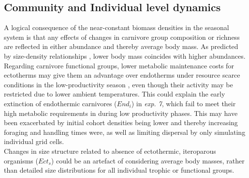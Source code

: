 \subsection{Community and Individual level dynamics}
A logical consequence of the near-constant biomass densities in the seasonal system is that any effects of changes in carnivore group composition or richness are reflected in either abundance and thereby average body mass. As predicted by size-density relationships \citep[cf.][]{White2007}, lower body mass coincides with higher abundances. \\
Regarding carnivore functional groups, lower metabolic maintenance costs for ectotherms may give them an advantage over endotherms under resource scarce conditions in the low-productivity season \citep{Shine2005}, even though their activity may be restricted due to lower ambient temperatures. 
This could explain the early extinction of endothermic carnivores ($End_i$) in \textit{exp. 7}, which fail to meet their high metabolic requirements in during low productivity phases. This may have been exacerbated by initial cohort densities being lower and thereby increasing foraging and handling times were, as well as limiting dispersal by only simulating individual grid cells.\\
Changes in size structure related to absence of ectothermic, iteroparous organisms ($Ect_s$) could be an artefact of considering average body masses, rather than detailed size distributions for all individual trophic or functional groups.
%
%

